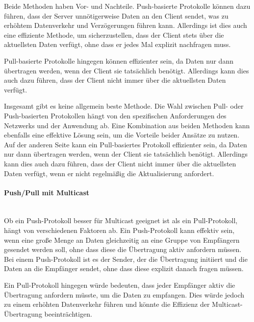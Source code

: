 \documentclass[../vs-script-first-v01.tex]{subfiles}
\begin{document}
Beide Methoden haben Vor- und Nachteile. Push-basierte Protokolle können dazu führen, dass der Server unnötigerweise Daten an den Client sendet, was zu erhöhtem Datenverkehr und Verzögerungen führen kann. Allerdings ist dies auch eine effiziente Methode, um sicherzustellen, dass der Client stets über die aktuellsten Daten verfügt, ohne dass er jedes Mal explizit nachfragen muss.

Pull-basierte Protokolle hingegen können effizienter sein, da Daten nur dann übertragen werden, wenn der Client sie tatsächlich benötigt. Allerdings kann dies auch dazu führen, dass der Client nicht immer über die aktuellsten Daten verfügt.

Insgesamt gibt es keine allgemein beste Methode. Die Wahl zwischen Pull- oder Push-basierten Protokollen hängt von den spezifischen Anforderungen des Netzwerks und der Anwendung ab. Eine Kombination aus beiden Methoden kann ebenfalls eine effektive Lösung sein, um die Vorteile beider Ansätze zu nutzen.
Auf der anderen Seite kann ein Pull-basiertes Protokoll effizienter sein, da Daten nur dann übertragen werden, wenn der Client sie tatsächlich benötigt. Allerdings kann dies auch dazu führen, dass der Client nicht immer über die aktuellsten Daten verfügt, wenn er nicht regelmäßig die Aktualisierung anfordert.
\paragraph{Push/Pull mit Multicast}\mbox{}\\
Ob ein Push-Protokoll besser für Multicast geeignet ist als ein Pull-Protokoll, hängt von verschiedenen Faktoren ab. Ein Push-Protokoll kann effektiv sein, wenn eine große Menge an Daten gleichzeitig an eine Gruppe von Empfängern gesendet werden soll, ohne dass diese die Übertragung aktiv anfordern müssen. Bei einem Push-Protokoll ist es der Sender, der die Übertragung initiiert und die Daten an die Empfänger sendet, ohne dass diese explizit danach fragen müssen.

Ein Pull-Protokoll hingegen würde bedeuten, dass jeder Empfänger aktiv die Übertragung anfordern müsste, um die Daten zu empfangen. Dies würde jedoch zu einem erhöhten Datenverkehr führen und könnte die Effizienz der Multicast-Übertragung beeinträchtigen.
\end{document}

